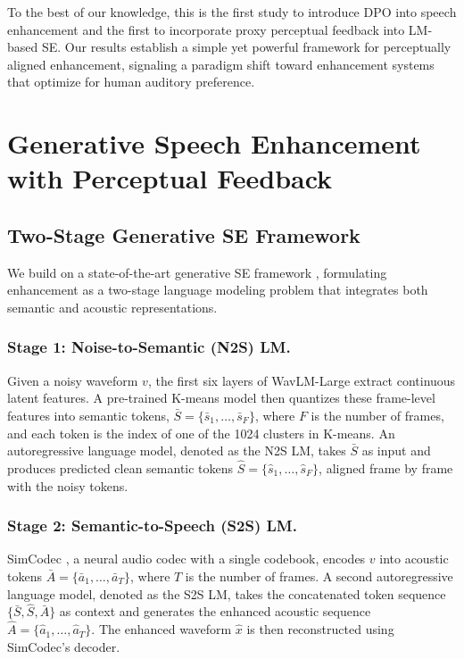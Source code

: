 \documentclass{article}
\begin{document}
To the best of our knowledge, this is the first study to introduce DPO into speech enhancement and the first to incorporate proxy perceptual feedback into LM-based SE. Our results establish a simple yet powerful framework for perceptually aligned enhancement, signaling a paradigm shift toward enhancement systems that optimize for human auditory preference.

\section{Generative Speech Enhancement with Perceptual Feedback}

\subsection{Two-Stage Generative SE Framework}
\label{subsec:gen-se}
We build on a state-of-the-art generative SE framework \cite{yao2025gense}, formulating enhancement as a two-stage language modeling problem that integrates both semantic and acoustic representations.  

\subsubsection{Stage 1: Noise-to-Semantic (N2S) LM.}  
Given a noisy waveform $v$, the first six layers of WavLM-Large \cite{chen2022wavlm} extract continuous latent features. A pre-trained K-means model then quantizes these frame-level features into semantic tokens, $\bar{S}=\{\bar{s}_1,\ldots,\bar{s}_F\}$, where $F$ is the number of frames, and each token is the index of one of the 1024 clusters in K-means. An autoregressive language model, denoted as the N2S LM, takes $\bar{S}$ as input and produces predicted clean semantic tokens $\hat{S} = \{\hat{s}_1, \ldots, \hat{s}_F\}$, aligned frame by frame with the noisy tokens.

\subsubsection{Stage 2: Semantic-to-Speech (S2S) LM.}  
SimCodec \cite{yao2025gense}, a neural audio codec with a single codebook, encodes $v$ into acoustic tokens $\bar{A}=\{\bar{a}_1,\ldots,\bar{a}_T\}$, where $T$ is the number of frames. A second autoregressive language model, denoted as the S2S LM, takes the concatenated token sequence $\{\bar{S}, \hat{S}, \bar{A}\}$ as context and generates the enhanced acoustic sequence $\hat{A}=\{\hat{a}_1,\ldots,\hat{a}_T\}$. The enhanced waveform $\hat{x}$ is then reconstructed using SimCodec’s decoder.  
\end{document}
